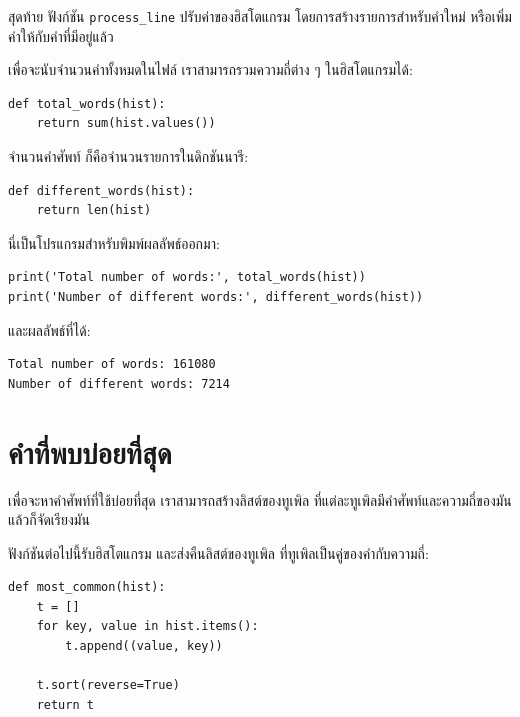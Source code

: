 สุดท้าย ฟังก์ชัน \verb|process_line| ปรับค่าของฮิสโตแกรม
โดยการสร้างรายการสำหรับคำใหม่ หรือเพิ่มค่าให้กับคำที่มีอยู่แล้ว


เพื่อจะนับจำนวนคำทั้งหมดในไฟล์
เราสามารถรวมความถี่ต่าง ๆ ในฮิสโตแกรมได้:

\begin{verbatim}
def total_words(hist):
    return sum(hist.values())
\end{verbatim}
%
%
จำนวนคำศัพท์ ก็คือจำนวนรายการในดิกชันนารี:

\begin{verbatim}
def different_words(hist):
    return len(hist)
\end{verbatim}
%
%
นี่เป็นโปรแกรมสำหรับพิมพ์ผลลัพธ์ออกมา:

\begin{verbatim}
print('Total number of words:', total_words(hist))
print('Number of different words:', different_words(hist))
\end{verbatim}
%
%
และผลลัพธ์ที่ได้:

\begin{verbatim}
Total number of words: 161080
Number of different words: 7214
\end{verbatim}
%

\section{คำที่พบบ่อยที่สุด}


เพื่อจะหาคำศัพท์ที่ใช้บ่อยที่สุด
เราสามารถสร้างลิสต์ของทูเพิล ที่แต่ละทูเพิลมีคำศัพท์และความถี่ของมัน
แล้วก็จัดเรียงมัน


ฟังก์ชันต่อไปนี้รับฮิสโตแกรม และส่งคืนลิสต์ของทูเพิล ที่ทูเพิลเป็นคู่ของคำกับความถี่:

\begin{verbatim}
def most_common(hist):
    t = []
    for key, value in hist.items():
        t.append((value, key))

    t.sort(reverse=True)
    return t
\end{verbatim}

